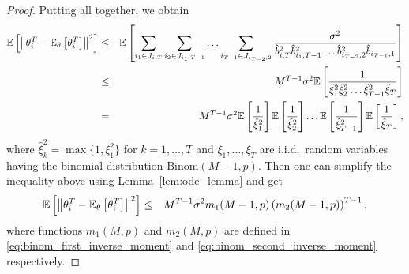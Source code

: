 \begin{proof}
Putting all together, we obtain
\begin{eqnarray*}
    \mathbb{E}\left[\left\|\theta_i^T - \mathbb{E}_{\theta}\left[\theta_i^T\right]\right\|^2\right] &\le& \mathbb{E}\left[\sum\limits_{i_1\in J_{i,T}}\sum\limits_{i_2\in J_{i_1,T-1}}\ldots \sum\limits_{i_{T-1}\in J_{i_{T-2},2}}\frac{\sigma^2}{\hat b_{i,T}^2 \hat b_{i_1,T-1}^2\ldots \hat b_{i_{T-2},2}^2\hat b_{i_{T-1},1}}\right]\\
    &\le& M^{T-1}\sigma^2\mathbb{E}\left[\frac{1}{\hat\xi_{1}^2 \hat\xi_{2}^2\ldots \hat\xi_{T-1}^2\hat\xi_{T}}\right]\\
    &=& M^{T-1}\sigma^2\mathbb{E}\left[\frac{1}{\hat\xi_{1}^2}\right]\mathbb{E}\left[\frac{1}{\hat\xi_{2}^2}\right]\ldots \mathbb{E}\left[\frac{1}{\hat\xi_{T-1}^2}\right]\mathbb{E}\left[\frac{1}{\hat\xi_{T}}\right],
\end{eqnarray*}
where $\hat \xi_k^2 = \max\{1,\xi_1^2\}$ for $k=1,\ldots,T$ and $\xi_1,\ldots,\xi_T$ are i.i.d.\ random variables having the binomial distribution $\text{Binom}(M-1, p)$. Then one can simplify the inequality above using Lemma~\ref{lem:ode_lemma} and get
\begin{eqnarray*}
    \mathbb{E}\left[\left\|\theta_i^T - \mathbb{E}_{\theta}\left[\theta_i^T\right]\right\|^2\right] &\le& M^{T-1}\sigma^2 m_1(M-1,p)\left(m_2(M-1,p)\right)^{T-1},
\end{eqnarray*}
where functions $m_1(M,p)$ and $m_2(M,p)$ are defined in \eqref{eq:binom_first_inverse_moment} and \eqref{eq:binom_second_inverse_moment} respectively.


\end{proof}
